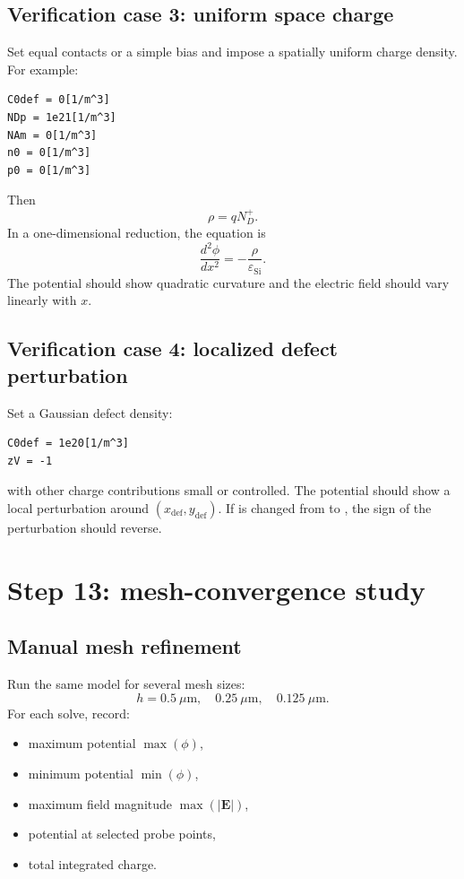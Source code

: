 \documentclass[11pt]{article}
\newcommand{\Evec}{\mathbf{E}}
\newcommand{\epss}{\varepsilon_{\mathrm{Si}}}
\newcommand{\code}[1]{\texttt{\detokenize{#1}}}
\begin{document}
\subsection{Verification case 3: uniform space charge}

Set equal contacts or a simple bias and impose a spatially uniform charge density. For example:
\begin{verbatim}
C0def = 0[1/m^3]
NDp = 1e21[1/m^3]
NAm = 0[1/m^3]
n0 = 0[1/m^3]
p0 = 0[1/m^3]
\end{verbatim}
Then
\begin{equation}
\rho=qN_D^+.
\end{equation}
In a one-dimensional reduction, the equation is
\begin{equation}
\frac{d^2\phi}{dx^2}=-\frac{\rho}{\epss}.
\end{equation}
The potential should show quadratic curvature and the electric field should vary linearly with $x$.

\subsection{Verification case 4: localized defect perturbation}

Set a Gaussian defect density:
\begin{verbatim}
C0def = 1e20[1/m^3]
zV = -1
\end{verbatim}
with other charge contributions small or controlled. The potential should show a local perturbation around $(x_{\mathrm{def}},y_{\mathrm{def}})$. If \code{zV} is changed from \code{-1} to \code{+1}, the sign of the perturbation should reverse.

\section{Step 13: mesh-convergence study}

\subsection{Manual mesh refinement}

Run the same model for several mesh sizes:
\begin{equation}
h=0.5~\mu\mathrm{m},\quad 0.25~\mu\mathrm{m},\quad 0.125~\mu\mathrm{m}.
\end{equation}
For each solve, record:
\begin{itemize}[leftmargin=2em]
\item maximum potential $\max(\phi)$,
\item minimum potential $\min(\phi)$,
\item maximum field magnitude $\max(|\Evec|)$,
\item potential at selected probe points,
\item total integrated charge.
\end{itemize}
\end{document}
